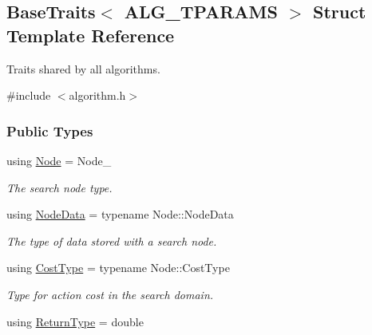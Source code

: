 \hypertarget{structBaseTraits}{}\subsection{Base\+Traits$<$ A\+L\+G\+\_\+\+T\+P\+A\+R\+A\+MS $>$ Struct Template Reference}
\label{structBaseTraits}


Traits shared by all algorithms.  




{\ttfamily \#include $<$algorithm.\+h$>$}

\subsubsection*{Public Types}
\begin{DoxyCompactItemize}
\item 
using \hyperlink{structBaseTraits_a219add24a6d21da59549d69e7d50c317}{Node} = Node\+\_\+\hypertarget{structBaseTraits_a219add24a6d21da59549d69e7d50c317}{}\label{structBaseTraits_a219add24a6d21da59549d69e7d50c317}

\begin{DoxyCompactList}\small\item\em The search node type. \end{DoxyCompactList}\item 
using \hyperlink{structBaseTraits_aff6ccd222b1fa15ef641a6a5e736b5d6}{Node\+Data} = typename Node\+::\+Node\+Data\hypertarget{structBaseTraits_aff6ccd222b1fa15ef641a6a5e736b5d6}{}\label{structBaseTraits_aff6ccd222b1fa15ef641a6a5e736b5d6}

\begin{DoxyCompactList}\small\item\em The type of data stored with a search node. \end{DoxyCompactList}\item 
using \hyperlink{structBaseTraits_ad824f4349691ddf268744bb750e97d23}{Cost\+Type} = typename Node\+::\+Cost\+Type\hypertarget{structBaseTraits_ad824f4349691ddf268744bb750e97d23}{}\label{structBaseTraits_ad824f4349691ddf268744bb750e97d23}

\begin{DoxyCompactList}\small\item\em Type for action cost in the search domain. \end{DoxyCompactList}\item 
using \hyperlink{structBaseTraits_a5f61168128df3c35fb3cdc2cb9512f27}{Return\+Type} = double\hypertarget{structBaseTraits_a5f61168128df3c35fb3cdc2cb9512f27}{}\label{structBaseTraits_a5f61168128df3c35fb3cdc2cb9512f27}


\end{DoxyCompactItemize}
